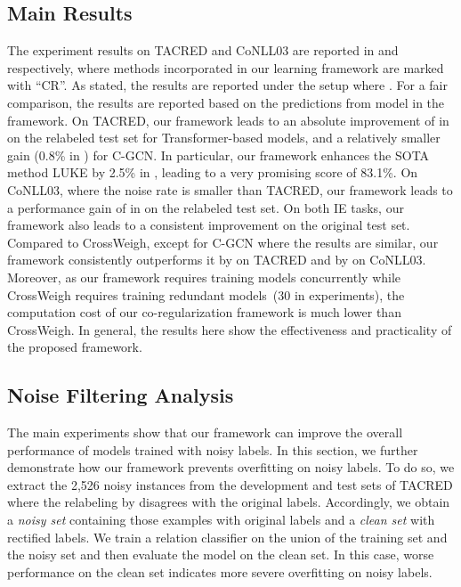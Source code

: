 \documentclass[11pt]{article}
\begin{document}
\subsection{Main Results}\label{ssec:main_results}
The experiment results on TACRED and CoNLL03 are reported in  and  respectively, where methods incorporated in our learning framework are marked with ``CR''.
As stated, the results are reported under the setup where .
For a fair comparison, the results are reported based on the predictions from model  in the framework.
On TACRED, our framework leads to an absolute improvement of  in
 on the relabeled test set for Transformer-based models, and a relatively smaller gain (0.8\% in ) for C-GCN.
In particular, our framework enhances the SOTA method LUKE by 2.5\% in , leading to a very promising  score of 83.1\%.
On CoNLL03, where the noise rate is smaller than TACRED, our framework leads to a performance gain of  in  on the relabeled test set.
On both IE tasks, our framework also leads to a consistent improvement on the original test set.
Compared to CrossWeigh, except for C-GCN where the results are similar, our framework consistently outperforms it by  on TACRED and by  on CoNLL03.
Moreover, as our framework requires training  models concurrently while CrossWeigh requires training redundant models~(30 in experiments), the computation cost of our co-regularization framework is much lower than CrossWeigh.
In general, the results here show the effectiveness and practicality of the proposed framework.



\subsection{Noise Filtering Analysis}\label{ssec:noise_filtering}
The main experiments show that our framework can improve the overall performance of models trained with noisy labels.
In this section, we further demonstrate how our framework prevents overfitting on noisy labels.
To do so, we extract the 2,526 noisy instances from the development and test sets of TACRED where the relabeling by \citet{Alt2020TACREDRA} disagrees with the original labels.
Accordingly, we obtain a \emph{noisy set} containing those examples with original labels and a \emph{clean set} with rectified labels. 
We train a relation classifier on the union of the training set and the noisy set and then evaluate the model on the clean set.
In this case, worse performance on the clean set indicates more severe overfitting on noisy labels.
\end{document}
